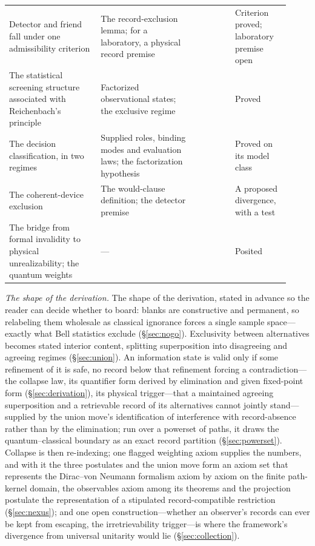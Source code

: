 \documentclass[11pt]{article}
\theoremstyle{definition}
\begin{document}
\begin{table}[htbp]
\begin{tabular}{@{}p{0.3\linewidth}p{0.32\linewidth}p{0.12\linewidth}p{0.18\linewidth}@{}}
Detector and friend fall under one admissibility criterion & The record-exclusion lemma; for a laboratory, a physical record premise & \cite{AethusRealist, AethusQuant} & Criterion proved; laboratory premise open \\
The statistical screening structure associated with Reichenbach's principle & Factorized observational states; the exclusive regime & \cite{AethusCausality} & Proved \\
The decision classification, in two regimes & Supplied roles, binding modes and evaluation laws; the factorization hypothesis & \cite{AethusDecision} & Proved on its model class \\
The coherent-device exclusion & The would-clause definition; the detector premise & \cite{Aethus} & A proposed divergence, with a test \\
The bridge from formal invalidity to physical unrealizability; the quantum weights & --- & \cite{Aethus, AethusQuant} & Posited \\
\bottomrule
\end{tabular}
\end{table}

    \textit{The shape of the derivation.} The shape of the derivation, stated in advance so the reader can decide whether to board: blanks are constructive and permanent, so relabeling them wholesale as classical ignorance forces a single sample space---exactly what Bell statistics exclude (\S\ref{sec:nogo}). Exclusivity between alternatives becomes stated interior content, splitting superposition into disagreeing and agreeing regimes (\S\ref{sec:union}). An information state is valid only if some refinement of it is safe, no record below that refinement forcing a contradiction---the collapse law,
its quantifier form derived by elimination and given fixed-point form (\S\ref{sec:derivation}), its physical trigger---that a maintained agreeing superposition and a retrievable record of its alternatives cannot jointly stand---supplied by the union move's identification of interference with record-absence rather than by the elimination;
run over a powerset of paths, it draws the quantum--classical boundary as an exact record partition (\S\ref{sec:powerset}). Collapse is then re-indexing; one flagged weighting axiom supplies the numbers, and with it the three postulates and the union move form an axiom set that represents the Dirac--von Neumann formalism axiom by axiom on the finite path-kernel domain, the observables axiom among its theorems and the projection postulate the representation of a stipulated record-compatible restriction (\S\ref{sec:nexus}); and one open construction---whether an observer's records can ever be kept from escaping, the irretrievability trigger---is where the framework's divergence from universal unitarity would lie (\S\ref{sec:collection}).
\end{document}
